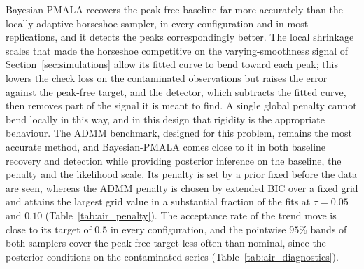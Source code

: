 Bayesian-PMALA recovers the peak-free baseline far more accurately than the locally adaptive horseshoe sampler, in every configuration and in most replications, and it detects the peaks correspondingly better. The local shrinkage scales that made the horseshoe competitive on the varying-smoothness signal of Section~\ref{sec:simulations} allow its fitted curve to bend toward each peak; this lowers the check loss on the contaminated observations but raises the error against the peak-free target, and the detector, which subtracts the fitted curve, then removes part of the signal it is meant to find. A single global penalty cannot bend locally in this way, and in this design that rigidity is the appropriate behaviour. The ADMM benchmark, designed for this problem, remains the most accurate method, and Bayesian-PMALA comes close to it in both baseline recovery and detection while providing posterior inference on the baseline, the penalty and the likelihood scale. Its penalty is set by a prior fixed before the data are seen, whereas the ADMM penalty is chosen by extended BIC over a fixed grid and attains the largest grid value in a substantial fraction of the fits at $\tau=0.05$ and $0.10$ (Table~\ref{tab:air_penalty}). The acceptance rate of the trend move is close to its target of $0.5$ in every configuration, and the pointwise $95\%$ bands of both samplers cover the peak-free target less often than nominal, since the posterior conditions on the contaminated series (Table~\ref{tab:air_diagnostics}).
